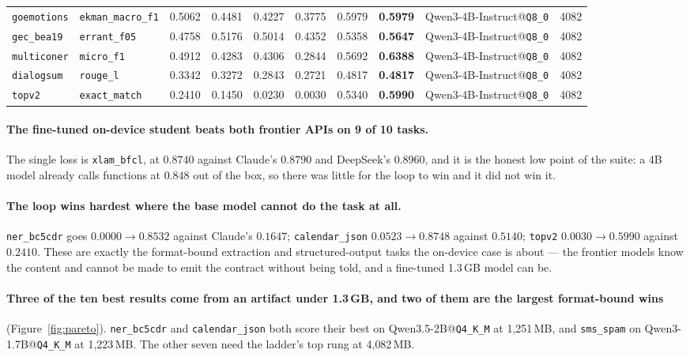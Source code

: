 \documentclass[sigconf,10pt]{acmart}
\newcommand{\tsk}[1]{\texttt{#1}}
\begin{document}
\begin{table}[t]
\begin{tabular}{@{}llrrrrrrlr@{}}
\tsk{goemotions}    & \tsk{ekman\_macro\_f1}  & 0.5062 & 0.4481 & 0.4227 & 0.3775 & 0.5979 & \textbf{0.5979} & Qwen3-4B-Instruct@\texttt{Q8\_0} & 4082 \\
\tsk{gec\_bea19}    & \tsk{errant\_f05}       & 0.4758 & 0.5176 & 0.5014 & 0.4352 & 0.5358 & \textbf{0.5647} & Qwen3-4B-Instruct@\texttt{Q8\_0} & 4082 \\
\tsk{multiconer}    & \tsk{micro\_f1}         & 0.4912 & 0.4283 & 0.4306 & 0.2844 & 0.5692 & \textbf{0.6388} & Qwen3-4B-Instruct@\texttt{Q8\_0} & 4082 \\
\tsk{dialogsum}     & \tsk{rouge\_l}          & 0.3342 & 0.3272 & 0.2843 & 0.2721 & 0.4817 & \textbf{0.4817} & Qwen3-4B-Instruct@\texttt{Q8\_0} & 4082 \\
\tsk{topv2}         & \tsk{exact\_match}      & 0.2410 & 0.1450 & 0.0230 & 0.0030 & 0.5340 & \textbf{0.5990} & Qwen3-4B-Instruct@\texttt{Q8\_0} & 4082 \\
\bottomrule
\end{tabular}
\end{table}

\paragraph{The fine-tuned on-device student beats both frontier APIs on 9 of 10 tasks.}
The single loss is \tsk{xlam\_bfcl}, at $0.8740$ against Claude's $0.8790$ and DeepSeek's
$0.8960$, and it is the honest low point of the suite: a 4B model already calls functions at
$0.848$ out of the box, so there was little for the loop to win and it did not win it.

\paragraph{The loop wins hardest where the base model cannot do the task at all.}
\tsk{ner\_bc5cdr} goes $0.0000 \to 0.8532$ against Claude's $0.1647$; \tsk{calendar\_json}
$0.0523 \to 0.8748$ against $0.5140$; \tsk{topv2} $0.0030 \to 0.5990$ against $0.2410$.
These are exactly the format-bound extraction and structured-output tasks the on-device case
is about --- the frontier models know the content and cannot be made to emit the contract
without being told, and a fine-tuned 1.3\,GB model can be.

\paragraph{Three of the ten best results come from an artifact under 1.3\,GB, and two of them
are the largest format-bound wins} (Figure~\ref{fig:pareto}). \tsk{ner\_bc5cdr} and
\tsk{calendar\_json} both score their best on Qwen3.5-2B@\texttt{Q4\_K\_M} at 1{,}251\,MB,
and \tsk{sms\_spam} on Qwen3-1.7B@\texttt{Q4\_K\_M} at 1{,}223\,MB. The other seven need the
ladder's top rung at 4{,}082\,MB.
\end{document}

